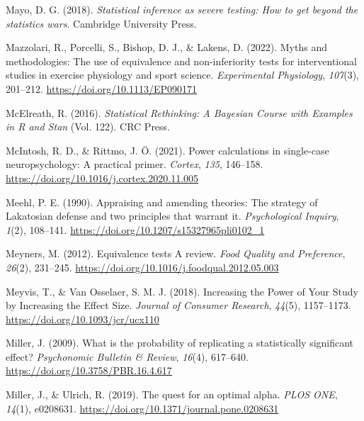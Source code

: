 \documentclass[
  letterpaper,
  DIV=11,
  numbers=noendperiod]{scrreprt}
\newlength{\cslhangindent}
\newlength{\cslentryspacingunit} %
\newenvironment{CSLReferences}[2] %
 {%
  \setlength{\parindent}{0pt}
  \ifodd #1
  \let\oldpar\par
  \def\par{\hangindent=\cslhangindent\oldpar}
  \fi
  \setlength{\parskip}{#2\cslentryspacingunit}
 }%
 {}
\begin{document}
\begin{CSLReferences}{1}{0}
\leavevmode{}%
Mayo, D. G. (2018). \emph{Statistical inference as severe testing: How
to get beyond the statistics wars}. {Cambridge University Press}.

\leavevmode{}%
Mazzolari, R., Porcelli, S., Bishop, D. J., \& Lakens, D. (2022). Myths
and methodologies: {The} use of equivalence and non-inferiority tests
for interventional studies in exercise physiology and sport science.
\emph{Experimental Physiology}, \emph{107}(3), 201--212.
\url{https://doi.org/10.1113/EP090171}

\leavevmode{}%
McElreath, R. (2016). \emph{Statistical {Rethinking}: {A Bayesian
Course} with {Examples} in {R} and {Stan}} (Vol. 122). {CRC Press}.

\leavevmode{}%
McIntosh, R. D., \& Rittmo, J. Ö. (2021). Power calculations in
single-case neuropsychology: {A} practical primer. \emph{Cortex},
\emph{135}, 146--158. \url{https://doi.org/10.1016/j.cortex.2020.11.005}

\leavevmode{}%
Meehl, P. E. (1990). Appraising and amending theories: {The} strategy of
{Lakatosian} defense and two principles that warrant it.
\emph{Psychological Inquiry}, \emph{1}(2), 108--141.
\url{https://doi.org/10.1207/s15327965pli0102_1}

\leavevmode{}%
Meyners, M. (2012). Equivalence tests \textendash{} {A} review.
\emph{Food Quality and Preference}, \emph{26}(2), 231--245.
\url{https://doi.org/10.1016/j.foodqual.2012.05.003}

\leavevmode{}%
Meyvis, T., \& Van Osselaer, S. M. J. (2018). Increasing the {Power} of
{Your Study} by {Increasing} the {Effect Size}. \emph{Journal of
Consumer Research}, \emph{44}(5), 1157--1173.
\url{https://doi.org/10.1093/jcr/ucx110}

\leavevmode{}%
Miller, J. (2009). What is the probability of replicating a
statistically significant effect? \emph{Psychonomic Bulletin \& Review},
\emph{16}(4), 617--640. \url{https://doi.org/10.3758/PBR.16.4.617}

\leavevmode{}%
Miller, J., \& Ulrich, R. (2019). The quest for an optimal alpha.
\emph{PLOS ONE}, \emph{14}(1), e0208631.
\url{https://doi.org/10.1371/journal.pone.0208631}


\end{CSLReferences}
\end{document}
